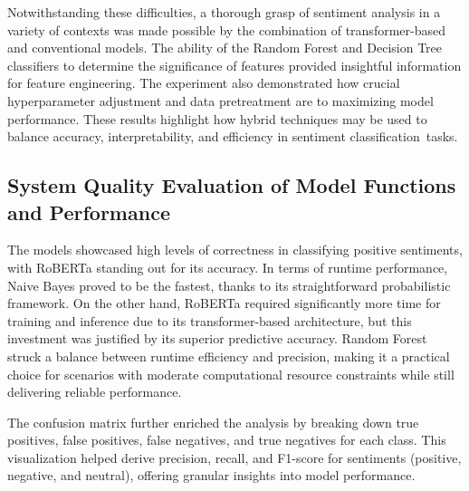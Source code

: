 \documentclass[journal]{IEEEtran}
\begin{document}
Notwithstanding these difficulties, a thorough grasp of sentiment analysis in a variety of contexts was made possible by the combination of transformer-based and conventional models. The ability of the Random Forest and Decision Tree classifiers to determine the significance of features provided insightful information for feature engineering. The experiment also demonstrated how crucial hyperparameter adjustment and data pretreatment are to maximizing model performance. These results highlight how hybrid techniques may be used to balance accuracy, interpretability, and efficiency in sentiment classification tasks.

\subsection{\textbf{System Quality Evaluation of Model Functions and Performance}}
The models showcased high levels of correctness in classifying positive sentiments, with RoBERTa standing out for its accuracy. In terms of runtime performance, Naive Bayes proved to be the fastest, thanks to its straightforward probabilistic framework. On the other hand, RoBERTa required significantly more time for training and inference due to its transformer-based architecture, but this investment was justified by its superior predictive accuracy. Random Forest struck a balance between runtime efficiency and precision, making it a practical choice for scenarios with moderate computational resource constraints while still delivering reliable performance.

The confusion matrix further enriched the analysis by breaking down true positives, false positives, false negatives, and true negatives for each class. This visualization helped derive precision, recall, and F1-score for sentiments (positive, negative, and neutral), offering granular insights into model performance.
\end{document}
